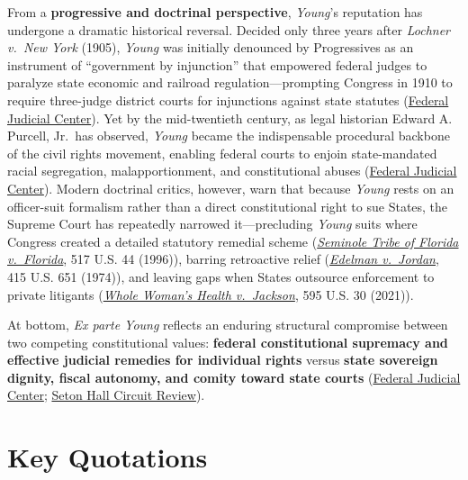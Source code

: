 \documentclass[12pt]{article}
\begin{document}
From a \textbf{progressive and doctrinal perspective}, \textit{Young}'s reputation has undergone a dramatic historical reversal. Decided only three years after \textit{Lochner v.\ New York} (1905), \textit{Young} was initially denounced by Progressives as an instrument of ``government by injunction'' that empowered federal judges to paralyze state economic and railroad regulation---prompting Congress in 1910 to require three-judge district courts for injunctions against state statutes (\href{https://www.fjc.gov/history/cases/cases-that-shaped-the-federal-courts/ex-parte-young}{Federal Judicial Center}). Yet by the mid-twentieth century, as legal historian Edward A. Purcell, Jr.\ has observed, \textit{Young} became the indispensable procedural backbone of the civil rights movement, enabling federal courts to enjoin state-mandated racial segregation, malapportionment, and constitutional abuses (\href{https://www.fjc.gov/history/cases/cases-that-shaped-the-federal-courts/ex-parte-young}{Federal Judicial Center}). Modern doctrinal critics, however, warn that because \textit{Young} rests on an officer-suit formalism rather than a direct constitutional right to sue States, the Supreme Court has repeatedly narrowed it---precluding \textit{Young} suits where Congress created a detailed statutory remedial scheme (\href{https://supreme.justia.com/cases/federal/us/517/44/}{\textit{Seminole Tribe of Florida v.\ Florida}}, 517 U.S. 44 (1996)), barring retroactive relief (\href{https://supreme.justia.com/cases/federal/us/415/651/}{\textit{Edelman v.\ Jordan}}, 415 U.S. 651 (1974)), and leaving gaps when States outsource enforcement to private litigants (\href{https://supreme.justia.com/cases/federal/us/595/21-463/}{\textit{Whole Woman's Health v.\ Jackson}}, 595 U.S. 30 (2021)).

At bottom, \textit{Ex parte Young} reflects an enduring structural compromise between two competing constitutional values: \textbf{federal constitutional supremacy and effective judicial remedies for individual rights} versus \textbf{state sovereign dignity, fiscal autonomy, and comity toward state courts} (\href{https://www.fjc.gov/history/cases/cases-that-shaped-the-federal-courts/ex-parte-young}{Federal Judicial Center}; \href{https://scholarship.shu.edu/cgi/viewcontent.cgi?article=1034&context=circuit_review}{Seton Hall Circuit Review}).

\section{Key Quotations}
\end{document}

